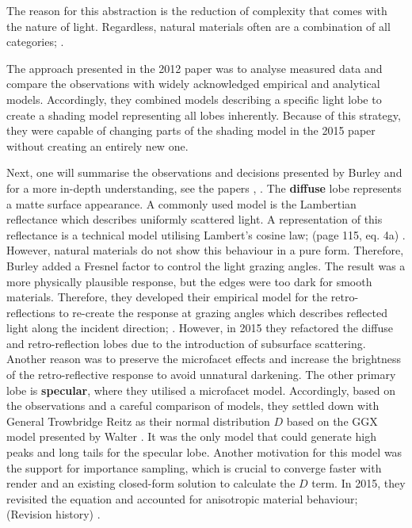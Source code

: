 The reason for this abstraction is the reduction of complexity that comes with the nature of light.
Regardless, natural materials often are a combination of all categories; \cite{cook_reflectance_1982}.

The approach presented in the 2012 paper \cite{burley_physically_2012} was to analyse measured data and compare the observations with widely acknowledged empirical and analytical models.
Accordingly, they combined models describing a specific light lobe to create a shading model representing all lobes inherently.
Because of this strategy, they were capable of changing parts of the shading model in the 2015 paper \cite{burley_extending_2015} without creating an entirely new one.

Next, one will summarise the observations and decisions presented by Burley and for a more in-depth understanding, see the papers \cite{burley_physically_2012}, \cite{burley_extending_2015}.
The \textbf{diffuse} lobe represents a matte surface appearance.
A commonly used model is the Lambertian reflectance which describes uniformly scattered light.
A representation of this reflectance is a technical model utilising Lambert's cosine law; (page 115, eq. 4a) \cite{lambert_lamberts_1892}.
However, natural materials do not show this behaviour in a pure form.
Therefore, Burley added a Fresnel factor to control the light grazing angles.
The result was a more physically plausible response, but the edges were too dark for smooth materials.
Therefore, they developed their empirical model for the retro-reflections to re-create the response at grazing angles which describes reflected light along the incident direction; \cite{berns_event_2021}.
However, in 2015 they refactored the diffuse and retro-reflection lobes due to the introduction of subsurface scattering.
Another reason was to preserve the microfacet effects and increase the brightness of the retro-reflective response to avoid unnatural darkening.
The other primary lobe is \textbf{specular}, where they utilised a microfacet model.
Accordingly, based on the observations and a careful comparison of models, they settled down with General Trowbridge Reitz as their normal distribution $D$ based on the GGX model presented by Walter \cite{walter_microfacet_2007}.
It was the only model that could generate high peaks and long tails for the specular lobe.
Another motivation for this model was the support for importance sampling, which is crucial to converge faster with render and an existing closed-form solution to calculate the $D$ term.
In 2015, they revisited the equation and accounted for anisotropic material behaviour; (Revision history) \cite{burley_physically_2012}.
